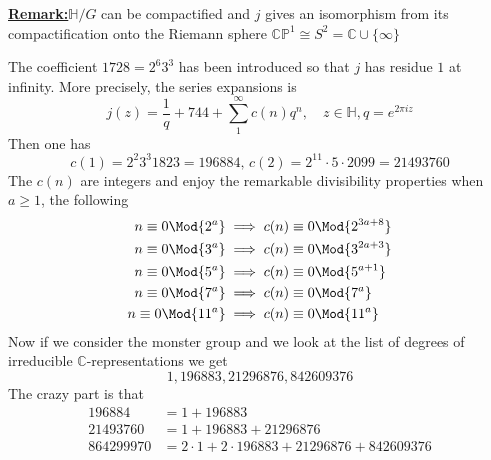 \documentclass[12pt]{article}
\theoremstyle{definition}
\newenvironment{remark}[1]{\par\noindent\underline{\textbf{Remark:}}\space#1}{}
\begin{document}
\begin{remark}
    \(\mathbb{H}/G\) can be compactified and \(j\) gives an isomorphism from its compactification onto the Riemann sphere \( \mathbb{C} \mathbb{P} ^1 \cong S^2 = \mathbb{C} \cup \{ \infty  \}  \) 
\end{remark}

The coefficient \(1728 = 2^6 3^3\) has been introduced so that \(j\) has residue \(1\) at infinity. More precisely, the series expansions is
\[
    j(z) =\frac{1}{q} + 744 + \sum_{1}^{\infty} c(n)q^n, \quad z\in \mathbb{H}, q = e^{2\pi iz}
\] 
Then one has
\[
    c(1) = 2^2 3^3 1823 = 196884, \, c(2) = 2^{11} \cdot 5 \cdot 2099 = 21493760 
\]
The \(c(n)\) are integers and enjoy the remarkable divisibility properties when \(a\geq 1\), the following 
\begin{align*}
n \equiv 0\Mod{2^a} &\implies c(n) \equiv 0 \Mod{2^{3a+8}}\\
n \equiv 0\Mod{3^a} &\implies c(n) \equiv 0 \Mod{3^{2a+3}}\\
n \equiv 0\Mod{5^a} &\implies c(n) \equiv 0 \Mod{5^{a+1}}\\
n \equiv 0\Mod{7^a} &\implies c(n) \equiv 0 \Mod{7^a}\\
n \equiv 0\Mod{11^a} &\implies c(n) \equiv 0 \Mod{11^a}
\end{align*}
Now if we consider the monster group and we look at the list of degrees of irreducible \(\mathbb{C} \)-representations we get
\[
    1,196883,21296876,842609376
\] 
The crazy part is that 
\begin{align*}
196884 &= 1+ 196883\\
21493760&= 1 +196883+21296876\\
864299970&=2 \cdot 1+2 \cdot 196883 + 21296876 +842609376
\end{align*}
\end{document}
